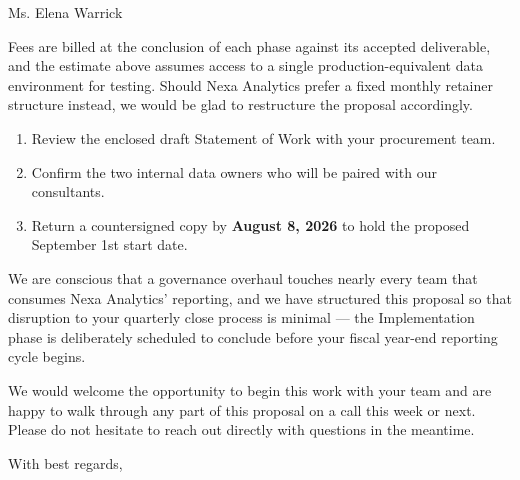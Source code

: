 \documentclass[a4paper,11pt]{scrletter}
\begin{document}
\begin{letter}{Ms. Elena Warrick}
\vspace{0.4cm}

Fees are billed at the conclusion of each phase against its accepted deliverable, and the estimate above assumes access to a single production-equivalent data environment for testing. Should Nexa Analytics prefer a fixed monthly retainer structure instead, we would be glad to restructure the proposal accordingly.

\begin{tcolorbox}[colback=softgray,colframe=sidebarnavy,boxrule=0.6pt,arc=1.5pt,
  left=8pt,right=8pt,top=6pt,bottom=6pt,title={\sffamily\bfseries\small Recommended Next Steps},
  coltitle=white,colbacktitle=sidebarnavy,fonttitle=\sffamily]
\begin{enumerate}[leftmargin=1.3em,itemsep=3pt,topsep=2pt]
  \item Review the enclosed draft Statement of Work with your procurement team.
  \item Confirm the two internal data owners who will be paired with our consultants.
  \item Return a countersigned copy by \textbf{August 8, 2026} to hold the proposed September 1st start date.
\end{enumerate}
\end{tcolorbox}

We are conscious that a governance overhaul touches nearly every team that consumes Nexa Analytics' reporting, and we have structured this proposal so that disruption to your quarterly close process is minimal --- the Implementation phase is deliberately scheduled to conclude before your fiscal year-end reporting cycle begins.

We would welcome the opportunity to begin this work with your team and are happy to walk through any part of this proposal on a call this week or next. Please do not hesitate to reach out directly with questions in the meantime.

\closing{With best regards,}

\vspace{0.2cm}



\end{letter}
\end{document}
